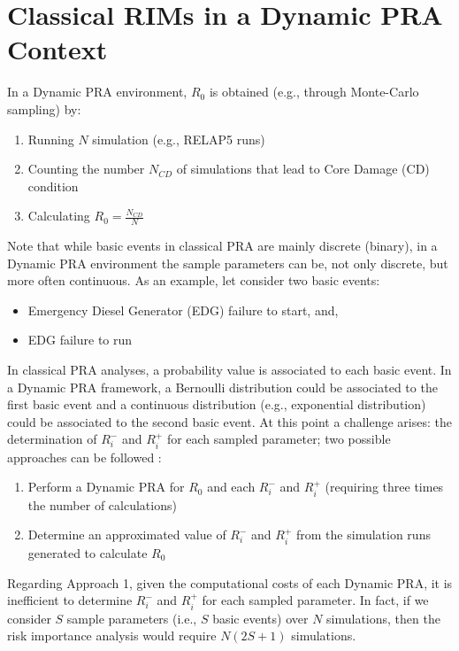 \section{Classical RIMs in a Dynamic PRA Context}
\label{sec:classicalRIMs_RISMC}

In a Dynamic PRA environment, $R_0$ is obtained (e.g., through Monte-Carlo sampling) by:
\begin{enumerate}
  \item Running $N$ simulation (e.g., RELAP5 runs)
  \item Counting the number $N_{CD}$ of simulations that lead to Core Damage (CD) condition
  \item Calculating $R_0= \frac{N_{CD}}{N}$
\end{enumerate}
Note that while basic events in classical PRA are mainly discrete (binary), in a Dynamic PRA environment the 
sample parameters can be, not only discrete, but more often continuous. As an example, let consider
two basic events:
\begin{itemize}
  \item Emergency Diesel Generator (EDG) failure to start, and, 
  \item EDG failure to run
\end{itemize}

In classical PRA analyses, a probability value is associated to each basic event. 
In a Dynamic PRA framework, a Bernoulli distribution could be associated to the first basic event and 
a continuous distribution (e.g., exponential distribution) could be associated to the second basic event. 
At this point a challenge arises: the determination of $R_i^-$ and $R_i^+$ for each sampled parameter; 
two possible approaches can be followed :
\begin{enumerate}
  \item Perform a Dynamic PRA for $R_0$ and each $R_i^-$ and $R_i^+$ (requiring three times the number of calculations)
  \item Determine an approximated value of $R_i^-$ and $R_i^+$ from the simulation runs generated to calculate $R_0$
\end{enumerate}
Regarding Approach 1, given the computational costs of each Dynamic PRA, it is inefficient to determine 
$R_i^-$ and $R_i^+$ for each sampled parameter. In fact, if we consider $S$ sample
parameters (i.e., $S$ basic events) over $N$ simulations, then the risk importance analysis would require $N(2S+1)$ simulations.

